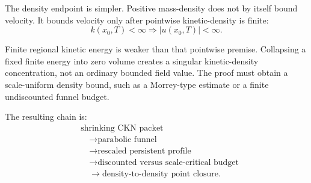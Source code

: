 \documentclass[11pt]{article}
\begin{document}
The density endpoint is simpler. Positive mass-density does not by itself bound velocity. It bounds velocity only after pointwise kinetic-density is finite:
\[
k(x_0,T)<\infty\Longrightarrow |u(x_0,T)|<\infty.
\]

Finite regional kinetic energy is weaker than that pointwise premise. Collapsing a fixed finite energy into zero volume creates a singular kinetic-density concentration, not an ordinary bounded field value. The proof must obtain a scale-uniform density bound, such as a Morrey-type estimate or a finite undiscounted funnel budget.

The resulting chain is:
\[
\begin{aligned}
&\text{shrinking CKN packet}\\
&\quad\to \text{parabolic funnel}\\
&\quad\to \text{rescaled persistent profile}\\
&\quad\to \text{discounted versus scale-critical budget}\\
&\quad\to \text{density-to-density point closure}.
\end{aligned}
\]
\end{document}
